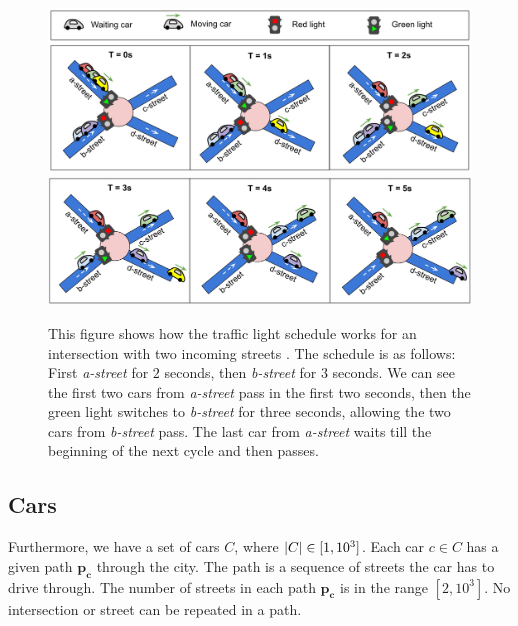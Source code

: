 \begin{figure}[ht] %
    \centering
    \includegraphics[width=\linewidth]{img/hashcode/figure2-abc.png}
    \includegraphics[width=\linewidth]{img/hashcode/figure2-def.png}
    \caption[Example of a traffic light schedule]{
        This figure shows how the traffic light schedule works for an intersection with two incoming streets \cite{google2023google}.
        The schedule is as follows: First \textit{a-street} for $2$ seconds, then \textit{b-street} for $3$ seconds.
        We can see the first two cars from \textit{a-street} pass in the first two seconds, then the green light switches to \textit{b-street} for three seconds,
        allowing the two cars from \textit{b-street} pass. The last car from \textit{a-street} waits till the beginning of the next cycle and then passes.
    }
    \label{fig:hashcode_traffic_lights}
\end{figure}

\subsection{Cars}

Furthermore, we have a set of cars $C$, where $\left|{C}\right| \in [1, 10^3]$. Each car $c \in C$ has a given path $\bm{p_c}$ through the city. The path is a sequence of streets the car has to drive through.
The number of streets in each path $\bm{p_c}$ is in the range $[2, 10^3]$.
No intersection or street can be repeated in a path.

